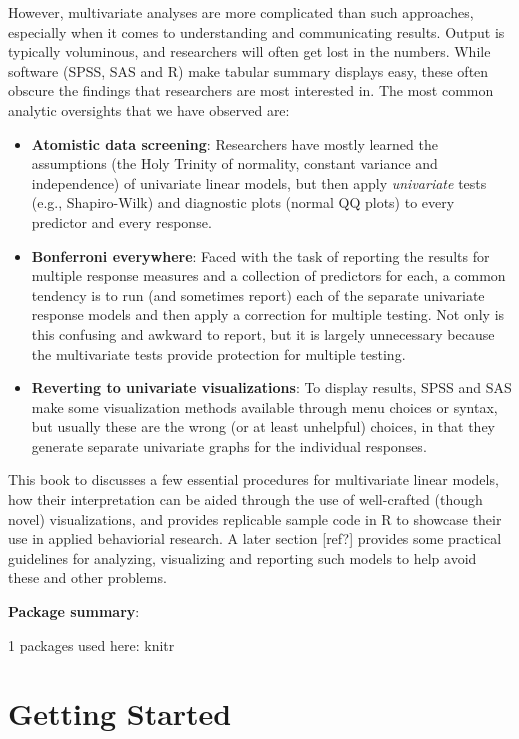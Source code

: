 \documentclass[
  letterpaper,
  10pt,
  krantz2]{krantz}
\begin{document}
However, multivariate analyses are more complicated than such
approaches, especially when it comes to understanding and communicating
results. Output is typically voluminous, and researchers will often get
lost in the numbers. While software (SPSS, SAS and R) make tabular
summary displays easy, these often obscure the findings that researchers
are most interested in. The most common analytic oversights that we have
observed are:

\begin{itemize}
\item
  \textbf{Atomistic data screening}: Researchers have mostly learned the
  assumptions (the Holy Trinity of normality, constant variance and
  independence) of univariate linear models, but then apply
  \emph{univariate} tests (e.g., Shapiro-Wilk) and diagnostic plots
  (normal QQ plots) to every predictor and every response.
\item
  \textbf{Bonferroni everywhere}: Faced with the task of reporting the
  results for multiple response measures and a collection of predictors
  for each, a common tendency is to run (and sometimes report) each of
  the separate univariate response models and then apply a correction
  for multiple testing. Not only is this confusing and awkward to
  report, but it is largely unnecessary because the multivariate tests
  provide protection for multiple testing.
\item
  \textbf{Reverting to univariate visualizations}: To display results,
  SPSS and SAS make some visualization methods available through menu
  choices or syntax, but usually these are the wrong (or at least
  unhelpful) choices, in that they generate separate univariate graphs
  for the individual responses.
\end{itemize}

This book to discusses a few essential procedures for multivariate
linear models, how their interpretation can be aided through the use of
well-crafted (though novel) visualizations, and provides replicable
sample code in R to showcase their use in applied behaviorial research.
A later section {[}ref?{]} provides some practical guidelines for
analyzing, visualizing and reporting such models to help avoid these and
other problems.

\textbf{Package summary}:

1 packages used here: knitr

\chapter{Getting Started}\label{sec-getting_started}
\end{document}
